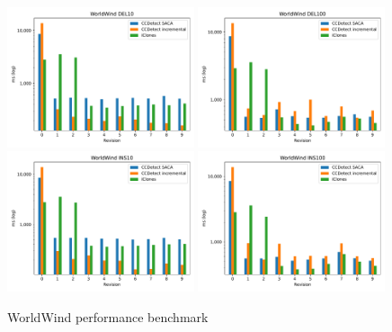 \newpage
\null
\vfill

\begin{figure}[H]
    \begin{center}
        \includegraphics[width=0.49\textwidth]{figures/performancegraphs/WorldWind_DEL10.pdf}
        \includegraphics[width=0.49\textwidth]{figures/performancegraphs/WorldWind_DEL100.pdf}
        \includegraphics[width=0.49\textwidth]{figures/performancegraphs/WorldWind_INS10.pdf}
        \includegraphics[width=0.49\textwidth]{figures/performancegraphs/WorldWind_INS100.pdf}
    \end{center}
    \caption{WorldWind performance benchmark}
    \label{fig:WorldWind}
\end{figure}

